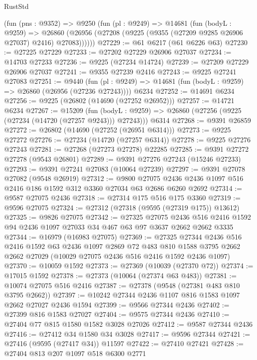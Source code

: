 \begin{lexlean}{RustStd}
\begin{coremodule}
    (fun (pns : @9352) =>
    @9250
      (fun (pl : @9249) =>
      @14681
        (fun (bodyL : @9259) =>
        @26860 (@26956 (@27208 (@9225 (@9355 (@27209 @9285 @26906 @27037) @2416) @27083))))))
@27229 := @61 @6217 (@61 @6226 @63)
@27230 := @27225 @27229
@27233 := @27202 @27229 @26906 @27037
@27234 := @14703 @27233
@27236 := @9225 (@27234 @14724)
@27239 := @27209 @27229 @26906 @27037
@27241 := @9355 @27239 @2416
@27243 := @9225 @27241 @27083
@27251 := @9440
    (fun (pl : @9249) => @14681 (fun (bodyL : @9259) => @26860 (@26956 (@27236 @27243))))
    @6234
@27252 := @14691 @6234
@27256 := @9225 (@26802 (@14690 (@27252 @26952)))
@27257 := @14721 @6234
@27267 := @15209
    (fun (bodyL : @9259) => @26860 (@27256 (@9225 (@27234 (@14720 (@27257 @9243))) @27243)))
    @6314
@27268 := @9391 @26859
@27272 := @26802 (@14690 (@27252 (@26951 @6314)))
@27273 := @9225 @27272
@27276 := @27234 (@14720 (@27257 @6314))
@27278 := @9225 @27276 @27243
@27281 := @27268 (@27273 @27278) @22285
@27285 := @9391 @27272 @27278 (@9543 @26801)
@27289 := @9391 @27276 @27243 (@15246 @27233)
@27293 := @9391 @27241 @27083 (@10064 @27239)
@27297 := @9391 @27078 @27082 (@9548 @26919)
@27312 := @9800
    @27075
    @2436
    @2436
    @1097
    @516
    @2416
    @186
    @1592
    @312
    @3360
    @27034
    @63
    @2686
    @6260
    @2692
@27314 := @9587 @27075 @2436
@27318 := @27314 @175 @516 @175 @3360
@27319 := @9596 @27075
@27324 := @27312 (@27318 (@9595 (@27319 @175)) @13612)
@27325 := @9826 @27075
@27342 := @27325
    @27075
    @2436
    @516
    @2416
    @1592
    @94
    @2436
    @1097
    @27033
    @34
    @467
    @63
    @97
    @3637
    @2662
    @2662
    @3335
@27344 := @16979 (@16983 @27075)
@27369 := @27325
    @27344
    @2436
    @516
    @2416
    @1592
    @63
    @2436
    @1097
    @2869
    @72
    @483
    @810
    @1588
    @3795
    @2662
    @2662
    @27029
    (@10029 @27075 @2436 @516 @2416 @1592 @2436 @1097)
@27370 := @10059 @1592
@27373 := @27369 (@10039 (@27370 @72))
@27374 := @17015 @1592
@27378 := @27373 (@10064 (@27374 @63 @483))
@27381 := @10074 @27075 @516 @2416
@27387 := @27378 (@9548 (@27381 @483 @810 @3795 @2662))
@27397 := @10242 @27344 @2436 @1107 @816 @1583 @1097 @2662 @27027 @2436 @1594
@27399 := @9566 @27344 @2436
@27402 := @27399 @816 @1583 @27027
@27404 := @9575 @27344 @2436
@27410 := @27404 @77 @815 @1580 @1582 @3028 @27026
@27412 := @9587 @27344 @2436
@27416 := @27412 @34 @1580 @34 @3028
@27417 := @9596 @27344
@27421 := @27416 (@9595 (@27417 @34)) @11597
@27422 := @27410 @27421
@27428 := @27404 @813 @207 @1097 @518 @6300 @2771

\end{coremodule}
\end{lexlean}
